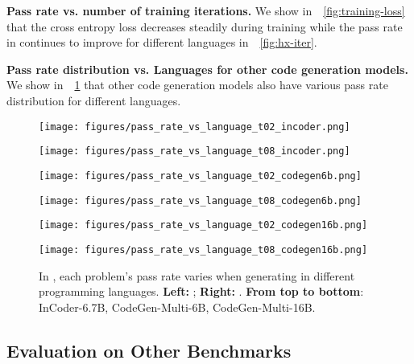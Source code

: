 \textbf{Pass rate vs. number of training iterations.} We show in~\figurename~\ref{fig:training-loss} that the cross entropy loss decreases steadily during training while the pass rate in \bench continues to improve for different languages in~\figurename~\ref{fig:hx-iter}.

\textbf{Pass rate distribution vs. Languages for other code generation models.} We show in~\figurename~\ref{fig:hx-distribution-other} that other code generation models also have various pass rate distribution for different languages.

\begin{figure}[htbp]
    \centering
    \begin{minipage}[t]{0.5\textwidth}
    \centering
    \texttt{[image: figures/pass\_rate\_vs\_language\_t02\_incoder.png]}
    \end{minipage}\begin{minipage}[t]{0.5\textwidth}
    \centering
    \texttt{[image: figures/pass\_rate\_vs\_language\_t08\_incoder.png]}
    \end{minipage}
    \begin{minipage}[t]{0.5\textwidth}
    \centering
    \texttt{[image: figures/pass\_rate\_vs\_language\_t02\_codegen6b.png]}
    \end{minipage}\begin{minipage}[t]{0.5\textwidth}
    \centering
    \texttt{[image: figures/pass\_rate\_vs\_language\_t08\_codegen6b.png]}
    \end{minipage}
    \begin{minipage}[t]{0.5\textwidth}
    \centering
    \texttt{[image: figures/pass\_rate\_vs\_language\_t02\_codegen16b.png]}
    \end{minipage}\begin{minipage}[t]{0.5\textwidth}
    \centering
    \texttt{[image: figures/pass\_rate\_vs\_language\_t08\_codegen16b.png]}
    \end{minipage}
    \caption{In \bench, each problem's pass rate varies when generating in different programming languages. \textbf{Left:} ; \textbf{Right:} . \textbf{From top to bottom}: InCoder-6.7B, CodeGen-Multi-6B, CodeGen-Multi-16B.}
    \label{fig:hx-distribution-other}
\end{figure}

\subsection{Evaluation on Other Benchmarks}
